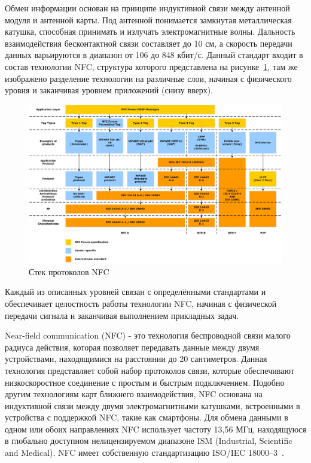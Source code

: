 Обмен информации основан на принципе индуктивной связи между антенной модуля и антенной карты.
Под антенной понимается замкнутая металлическая катушка, способная принимать и излучать электромагнитные волны.
Дальность взаимодействия бесконтактной связи составляет до 10 см, а скорость передачи данных варьируются в диапазон от 106 до 848 кбит/с.
Данный стандарт входит в состав технологии NFC, структура которого представлена на рисунке~\ref{fig:nfc_tech}, там же изображено разделение технологии на различные слои, начиная с физического уровня и заканчивая уровнем приложений (снизу вверх).

\begin{figure}[H]
    \centering
    \includegraphics[width=1\textwidth]{images/research/nfc_tech}
    \caption{\centering Стек протоколов NFC}
    \label{fig:nfc_tech}
\end{figure}

Каждый из описанных уровней связан с определёнными стандартами и обеспечивает целостность работы технологии NFC, начиная с физической передачи сигнала и заканчивая выполнением прикладных задач.

Near-field communication (NFC) - это технология беспроводной связи малого радиуса действия, которая позволяет передавать данные между двумя устройствами, находящимися на расстоянии до 20 сантиметров.
Данная технология представляет собой набор протоколов связи, которые обеспечивают низкоскоростное соединение с простым и быстрым подключением.
Подобно другим технологиям карт ближнего взаимодействия, NFC основана на индуктивной связи между двумя электромагнитными катушками, встроенными в устройства с поддержкой NFC, такие как смартфоны.
Для обмена данными в одном или обоих направлениях NFC использует частоту 13,56 МГц, находящуюся в глобально доступном нелицензируемом диапазоне ISM (Industrial, Scientific and Medical).
NFC имеет собственную стандартизацию ISO/IEC 18000--3~\cite{nfc_wiki}.

